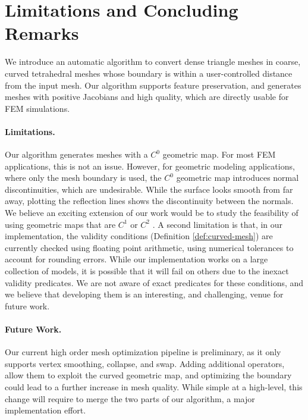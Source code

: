 \section{Limitations and Concluding Remarks}\label{sec:conclusion}

We introduce an automatic algorithm to convert dense triangle meshes in coarse, curved tetrahedral meshes whose boundary is within a user-controlled distance from the input mesh. Our algorithm supports feature preservation, and generates meshes with positive Jacobians and high quality, which are directly usable for FEM simulations. 

\paragraph{Limitations.} Our algorithm generates meshes with a $C^0$ geometric map. For most FEM applications, this is not an issue. However, for geometric modeling applications, where only the mesh boundary is used, the $C^0$ geometric map introduces normal discontinuities, which are undesirable.
While the surface looks smooth from  far away, plotting the reflection lines shows the discontinuity between the normals. We believe an exciting extension of our work would be to study the feasibility of using geometric maps that are $C^1$ \cite{lyche2015simplex} or $C^2$ \cite{Xia:2017:IGA}. A second limitation is that, in our implementation, the validity conditions (Definition \ref{def:curved-mesh}) are currently checked using floating point arithmetic, using numerical tolerances to account for rounding errors. While our implementation works on a large collection of models, it is possible that it will fail on others due to the inexact validity predicates. We are not aware of exact predicates for these conditions, and we believe that developing them is an interesting, and challenging, venue for future work.

\paragraph{Future Work.} Our current high order mesh optimization pipeline is preliminary, as it only supports vertex smoothing, collapse, and swap. Adding additional operators, allow them to exploit the curved geometric map, and optimizing the boundary could lead to a further increase in mesh quality. While simple at a high-level, this change will require to merge the two parts of our algorithm, a major implementation effort.

